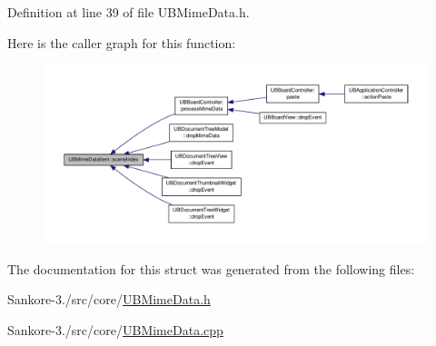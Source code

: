Definition at line 39 of file U\-B\-Mime\-Data.\-h.



Here is the caller graph for this function\-:
\nopagebreak
\begin{figure}[H]
\begin{center}
\leavevmode
\includegraphics[width=350pt]{da/dba/struct_u_b_mime_data_item_a1c596d4dd198c6c454b40a4ad10cf7fd_icgraph}
\end{center}
\end{figure}




The documentation for this struct was generated from the following files\-:\begin{DoxyCompactItemize}
\item 
Sankore-\/3./src/core/\hyperlink{_u_b_mime_data_8h}{U\-B\-Mime\-Data.\-h}\item 
Sankore-\/3./src/core/\hyperlink{_u_b_mime_data_8cpp}{U\-B\-Mime\-Data.\-cpp}\end{DoxyCompactItemize}
